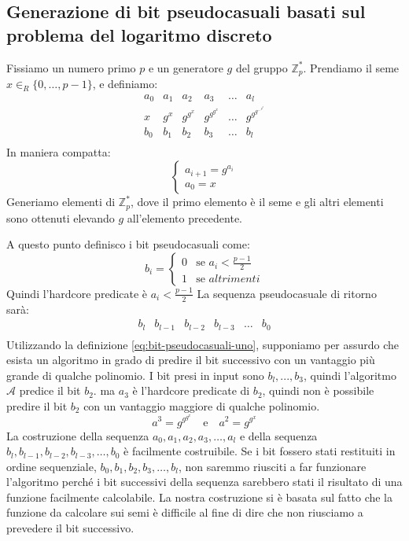 \subsection{Generazione di bit pseudocasuali basati sul problema del logaritmo discreto} \label{subs:generazione-bit-pseudocasuali}
Fissiamo un numero primo $p$ e un generatore $g$ del gruppo $\mathbb{Z}_p^*$.
Prendiamo il seme $x \in_R \{0,\dots,p-1\}$, e definiamo:
\[
\begin{array}{llllll}
  a_0 & a_1 & a_2 & a_3 & \dots & a_l \\
  x & g^x & g^{g^x} & g^{g^{g^x}} & \dots & g^{g^{g^{\dots^{g^x}}}} \\
  b_0 & b_1 & b_2 & b_3 & \dots & b_l \\
\end{array}
\]
In maniera compatta:
\[
  \begin{cases}
    a_{i + 1} = g^{a_i} \\
    a_0 = x
  \end{cases}
\]
Generiamo elementi di $\mathbb{Z}_p^*$, dove il primo elemento è il seme 
e gli altri elementi sono ottenuti elevando $g$ all'elemento precedente.

A questo punto definisco i bit pseudocasuali come:
\[
  b_i = \begin{cases}
    0 & \text{se } a_i < \frac{p-1}{2} \\
    1 & \text{se } altrimenti
    \end{cases}
\]
Quindi l'hardcore predicate è $a_i < \frac{p - 1}{2}$
La sequenza pseudocasuale di ritorno sarà:
\[
\begin{array}{llllll}
  b_l & b_{l-1} & b_{l-2} & b_{l-3} & \dots & b_0 \\
\end{array}
\]
Utilizzando la definizione \ref{eq:bit-pseudocasuali-uno}, supponiamo per assurdo che esista 
un algoritmo in grado di predire il bit successivo con un vantaggio più grande 
di qualche polinomio.
I bit presi in input sono $b_l, ..., b_3$, quindi l'algoritmo $\mathcal{A}$ predice il 
bit $b_2$. ma $a_3$ è l'hardcore predicate di $b_2$, quindi non è possibile 
predire il bit $b_2$ con un vantaggio maggiore di qualche polinomio.
\[
  a^3 = g^{g^{g^x}} \quad \text{e} \quad a^2 = g^{g^x}
\]
La costruzione della sequenza 
$a_0, a_1, a_2, a_3, \dots, a_l$ e della sequenza $b_l, b_{l-1}, b_{l-2}, b_{l-3}, \dots, b_0$
è facilmente costruibile. Se i bit fossero stati restituiti in ordine sequenziale, 
$b_0, b_1, b_2, b_3, \dots, b_l$, non saremmo riusciti a far funzionare 
l'algoritmo perché i bit successivi della 
sequenza sarebbero stati il risultato di una funzione facilmente calcolabile.
La nostra costruzione si è basata sul fatto che la funzione da calcolare
sui semi è difficile al fine di dire che non riusciamo a prevedere il bit successivo.


